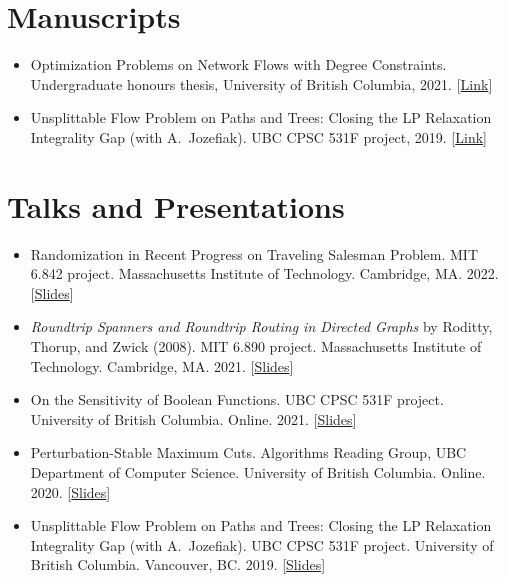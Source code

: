 \documentclass[letterpaper,11pt]{article}
\newcommand{\manuscriptItem}[1]{
  \item #1 \vspace{-7pt}
}
\newcommand{\resumeSubHeadingListStart}{\begin{itemize}[leftmargin=*]}
\newcommand{\resumeSubHeadingListEnd}{\end{itemize}}
\begin{document}
\section{Manuscripts}
  \resumeSubHeadingListStart
    \manuscriptItem{Optimization Problems on Network Flows with Degree Constraints. Undergraduate
    honours thesis, University of British Columbia, 2021. [\href{https://ypan.me/docs/ug-thesis.pdf}{Link}]}
    \manuscriptItem{Unsplittable Flow Problem on Paths and Trees: Closing the LP Relaxation Integrality Gap (with A.\ Jozefiak). UBC CPSC 531F project, 2019. [\href{https://ypan.me/docs/ufp-survey.pdf}{Link}]}
  \resumeSubHeadingListEnd

\vspace{-5pt}
\section{Talks and Presentations}
\resumeSubHeadingListStart
  \manuscriptItem{Randomization in Recent Progress on Traveling Salesman Problem. MIT 6.842 project. Massachusetts Institute of Technology. Cambridge, MA. 2022. [\href{https://ypan.me/docs/tsp-slides.pdf}{Slides}]}
  \manuscriptItem{\emph{Roundtrip Spanners and Roundtrip Routing in Directed Graphs} by Roditty, Thorup, and Zwick (2008). MIT 6.890 project. Massachusetts Institute of Technology.
  Cambridge, MA. 2021. [\href{https://ypan.me/docs/roundtrip-slides.pdf}{Slides}]}
  \manuscriptItem{On the Sensitivity of Boolean Functions. UBC CPSC 531F project. University of
  British Columbia. Online. 2021. [\href{https://ypan.me/docs/sensitivity-slides.pdf}{Slides}]}
  \manuscriptItem{Perturbation-Stable Maximum Cuts. Algorithms Reading Group, UBC Department of Computer
  Science. University of British Columbia. Online. 2020. [\href{https://ypan.me/docs/maxcut.pdf}{Slides}]}
  \manuscriptItem{Unsplittable Flow Problem on Paths and Trees: Closing the LP Relaxation Integrality Gap (with A.\ Jozefiak). UBC CPSC 531F project. University of British
  Columbia. Vancouver, BC. 2019. [\href{https://ypan.me/docs/ufp-slides.pdf}{Slides}]}
\resumeSubHeadingListEnd

\end{document}
